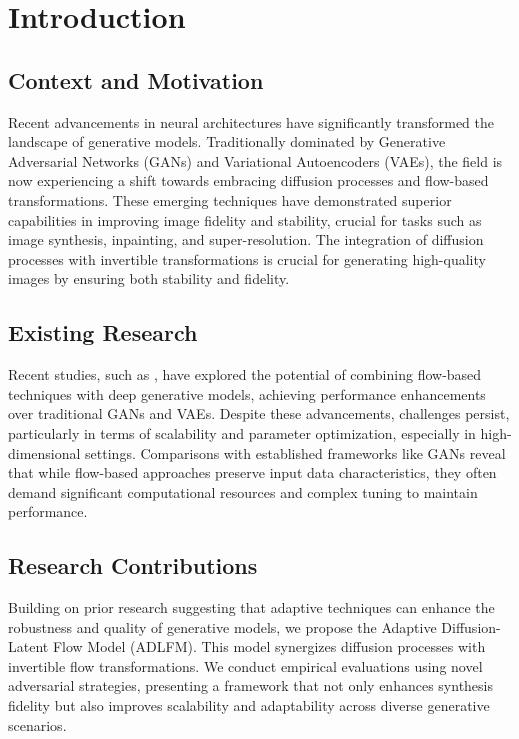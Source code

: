 \section{Introduction}

\subsection{Context and Motivation}
Recent advancements in neural architectures have significantly transformed the landscape of generative models. Traditionally dominated by Generative Adversarial Networks (GANs) and Variational Autoencoders (VAEs), the field is now experiencing a shift towards embracing diffusion processes and flow-based transformations. These emerging techniques have demonstrated superior capabilities in improving image fidelity and stability, crucial for tasks such as image synthesis, inpainting, and super-resolution. The integration of diffusion processes with invertible transformations is crucial for generating high-quality images by ensuring both stability and fidelity.

\subsection{Existing Research}
Recent studies, such as \cite{dinh2016density, kingma2018glow}, have explored the potential of combining flow-based techniques with deep generative models, achieving performance enhancements over traditional GANs and VAEs. Despite these advancements, challenges persist, particularly in terms of scalability and parameter optimization, especially in high-dimensional settings. Comparisons with established frameworks like GANs reveal that while flow-based approaches preserve input data characteristics, they often demand significant computational resources and complex tuning to maintain performance.

\subsection{Research Contributions}
Building on prior research suggesting that adaptive techniques can enhance the robustness and quality of generative models, we propose the Adaptive Diffusion-Latent Flow Model (ADLFM). This model synergizes diffusion processes with invertible flow transformations. We conduct empirical evaluations using novel adversarial strategies, presenting a framework that not only enhances synthesis fidelity but also improves scalability and adaptability across diverse generative scenarios.

